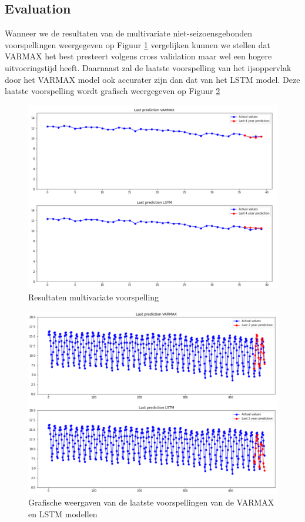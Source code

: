 \subsection{Evaluation}

Wanneer we de resultaten van de multivariate niet-seizoensgebonden voorspellingen weergegeven op Figuur \ref{fig:mvnsresult} vergelijken kunnen we stellen dat VARMAX het best presteert volgens cross validation maar wel een hogere uitvoeringstijd heeft. Daarnaast zal de laatste voorspelling van het ijsoppervlak door het VARMAX model ook accurater zijn dan dat van het LSTM model. Deze laatste voorspelling wordt grafisch weergegeven op Figuur \ref{fig:mvnsresultgraph}

\begin{figure}
    \centering
    \caption{Resultaten multivariate voorspelling}
    \label{fig:mvnsresult}
    \includegraphics[width=1\linewidth]{mv_ns_result}
\end{figure}

\begin{figure}
    \centering
    \caption{Grafische weergaven van de laatste voorspellingen van de VARMAX en LSTM modellen}
    \label{fig:mvnsresultgraph}
    \includegraphics[width=1\linewidth]{mv_ns_result_graph}
\end{figure}




